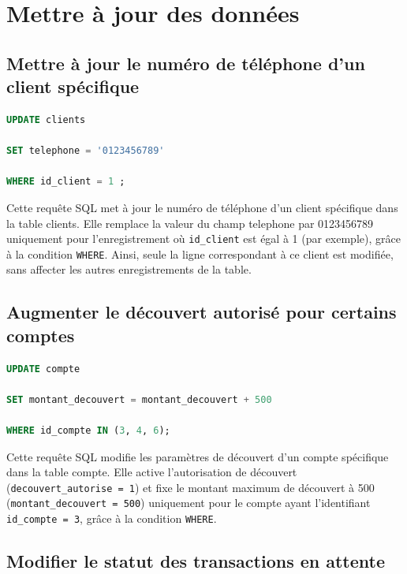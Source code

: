 \documentclass[12pt,a4paper]{article}
\begin{document}
\section{Mettre à jour des données}

	\subsection{Mettre à jour le numéro de téléphone d'un client spécifique}
\begin{lstlisting}[language=SQL]
UPDATE clients 

SET telephone = '0123456789' 

WHERE id_client = 1 ; 
\end{lstlisting}

\vspace{.5cm}

Cette requête SQL met à jour le numéro de téléphone d'un client spécifique dans la table clients. Elle remplace la valeur du champ telephone par 0123456789 uniquement pour l'enregistrement où \texttt{id\_client} est égal à 1 (par exemple), grâce à la condition \texttt{WHERE}. Ainsi, seule la ligne correspondant à ce client est modifiée, sans affecter les autres enregistrements de la table. 
	
	\subsection{Augmenter le découvert autorisé pour certains comptes}

\begin{lstlisting}[language=SQL]
UPDATE compte

SET montant_decouvert = montant_decouvert + 500

WHERE id_compte IN (3, 4, 6);
\end{lstlisting}

\vspace{.5cm}

Cette requête SQL modifie les paramètres de découvert d'un compte spécifique dans la table compte. Elle active l'autorisation de découvert (\texttt{decouvert\_autorise = 1}) et fixe le montant maximum de découvert à 500 (\texttt{montant\_decouvert = 500}) uniquement pour le compte ayant l'identifiant \texttt{id\_compte = 3}, grâce à la condition \texttt{WHERE}. 

	\subsection{Modifier le statut des transactions en attente}
\end{document}
